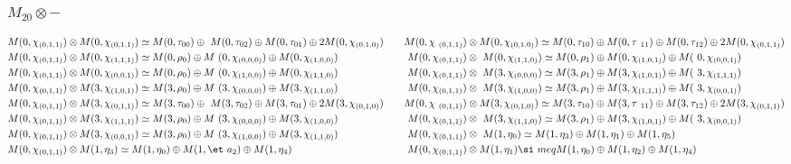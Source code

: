 \subsubsection{$M_20\otimes -$}
\begin{align*}
M(0,\chi_{(0,1,1)}) &\otimes M(0,\chi_{(0,1,1)}) \simeq M(0,\tau_{00}) \oplus \
M(0,\tau_{02}) \oplus M(0,\tau_{01}) \oplus 2 M(0,\chi_{(0,1,0)}) &&& M(0,\chi\
_{(0,1,1)}) &\otimes M(0,\chi_{(0,1,0)}) \simeq M(0,\tau_{10}) \oplus M(0,\tau\
_{11}) \oplus M(0,\tau_{12}) \oplus 2 M(0,\chi_{(0,1,1)})\\
M(0,\chi_{(0,1,1)}) &\otimes M(0,\chi_{(1,1,1)}) \simeq M(0,\rho_{0}) \oplus M\
(0,\chi_{(0,0,0)}) \oplus M(0,\chi_{(1,0,0)}) &&& M(0,\chi_{(0,1,1)}) &\otimes\
 M(0,\chi_{(1,1,0)}) \simeq M(0,\rho_{1}) \oplus M(0,\chi_{(1,0,1)}) \oplus M(\
0,\chi_{(0,0,1)})\\
M(0,\chi_{(0,1,1)}) &\otimes M(0,\chi_{(0,0,1)}) \simeq M(0,\rho_{0}) \oplus M\
(0,\chi_{(1,0,0)}) \oplus M(0,\chi_{(1,1,0)}) &&& M(0,\chi_{(0,1,1)}) &\otimes\
 M(3,\chi_{(0,0,0)}) \simeq M(3,\rho_{1}) \oplus M(3,\chi_{(1,0,1)}) \oplus M(\
3,\chi_{(1,1,1)})\\
M(0,\chi_{(0,1,1)}) &\otimes M(3,\chi_{(1,0,1)}) \simeq M(3,\rho_{0}) \oplus M\
(3,\chi_{(0,0,0)}) \oplus M(3,\chi_{(1,1,0)}) &&& M(0,\chi_{(0,1,1)}) &\otimes\
 M(3,\chi_{(1,0,0)}) \simeq M(3,\rho_{1}) \oplus M(3,\chi_{(1,1,1)}) \oplus M(\
3,\chi_{(0,0,1)})\\
M(0,\chi_{(0,1,1)}) &\otimes M(3,\chi_{(0,1,1)}) \simeq M(3,\tau_{00}) \oplus \
M(3,\tau_{02}) \oplus M(3,\tau_{01}) \oplus 2 M(3,\chi_{(0,1,0)}) &&& M(0,\chi\
_{(0,1,1)}) &\otimes M(3,\chi_{(0,1,0)}) \simeq M(3,\tau_{10}) \oplus M(3,\tau\
_{11}) \oplus M(3,\tau_{12}) \oplus 2 M(3,\chi_{(0,1,1)})\\
M(0,\chi_{(0,1,1)}) &\otimes M(3,\chi_{(1,1,1)}) \simeq M(3,\rho_{0}) \oplus M\
(3,\chi_{(0,0,0)}) \oplus M(3,\chi_{(1,0,0)}) &&& M(0,\chi_{(0,1,1)}) &\otimes\
 M(3,\chi_{(1,1,0)}) \simeq M(3,\rho_{1}) \oplus M(3,\chi_{(1,0,1)}) \oplus M(\
3,\chi_{(0,0,1)})\\
M(0,\chi_{(0,1,1)}) &\otimes M(3,\chi_{(0,0,1)}) \simeq M(3,\rho_{0}) \oplus M\
(3,\chi_{(1,0,0)}) \oplus M(3,\chi_{(1,1,0)}) &&& M(0,\chi_{(0,1,1)}) &\otimes\
 M(1,\eta_{0}) \simeq M(1,\eta_{3}) \oplus M(1,\eta_{1}) \oplus M(1,\eta_{5})\
\\
M(0,\chi_{(0,1,1)}) &\otimes M(1,\eta_{3}) \simeq M(1,\eta_{0}) \oplus M(1,\et\
a_{2}) \oplus M(1,\eta_{4}) &&& M(0,\chi_{(0,1,1)}) &\otimes M(1,\eta_{1}) \si\
meq M(1,\eta_{0}) \oplus M(1,\eta_{2}) \oplus M(1,\eta_{4})\\

\end{align*}
